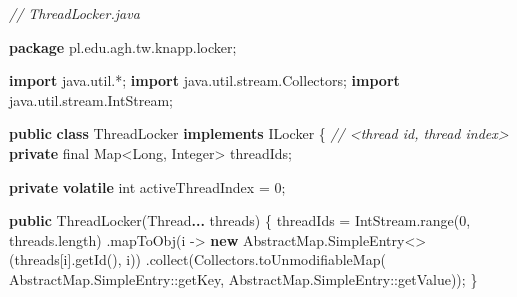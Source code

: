 \documentclass[11pt]{article}
\newenvironment{Shaded}{}{}
\newcommand{\KeywordTok}[1]{\textcolor[rgb]{0.00,0.44,0.13}{\textbf{{#1}}}}
\newcommand{\DataTypeTok}[1]{\textcolor[rgb]{0.56,0.13,0.00}{{#1}}}
\newcommand{\DecValTok}[1]{\textcolor[rgb]{0.25,0.63,0.44}{{#1}}}
\newcommand{\CommentTok}[1]{\textcolor[rgb]{0.38,0.63,0.69}{\textit{{#1}}}}
\newcommand{\FunctionTok}[1]{\textcolor[rgb]{0.02,0.16,0.49}{{#1}}}
\newcommand{\NormalTok}[1]{{#1}}
\newcommand{\ImportTok}[1]{{#1}}
\newcommand{\OperatorTok}[1]{\textcolor[rgb]{0.40,0.40,0.40}{{#1}}}
\newcommand{\BuiltInTok}[1]{{#1}}
\begin{document}
\begin{Shaded}
\begin{Highlighting}[]
\CommentTok{// ThreadLocker.java}

\KeywordTok{package}\ImportTok{ pl}\OperatorTok{.}\ImportTok{edu}\OperatorTok{.}\ImportTok{agh}\OperatorTok{.}\ImportTok{tw}\OperatorTok{.}\ImportTok{knapp}\OperatorTok{.}\ImportTok{locker}\OperatorTok{;}

\KeywordTok{import} \ImportTok{java}\OperatorTok{.}\ImportTok{util}\OperatorTok{.*;}
\KeywordTok{import} \ImportTok{java}\OperatorTok{.}\ImportTok{util}\OperatorTok{.}\ImportTok{stream}\OperatorTok{.}\ImportTok{Collectors}\OperatorTok{;}
\KeywordTok{import} \ImportTok{java}\OperatorTok{.}\ImportTok{util}\OperatorTok{.}\ImportTok{stream}\OperatorTok{.}\ImportTok{IntStream}\OperatorTok{;}

\KeywordTok{public} \KeywordTok{class}\NormalTok{ ThreadLocker }\KeywordTok{implements}\NormalTok{ ILocker }\OperatorTok{\{}
    \CommentTok{// \textless{}thread id, thread index\textgreater{}}
    \KeywordTok{private} \DataTypeTok{final} \BuiltInTok{Map}\OperatorTok{\textless{}}\BuiltInTok{Long}\OperatorTok{,} \BuiltInTok{Integer}\OperatorTok{\textgreater{}}\NormalTok{ threadIds}\OperatorTok{;}

    \KeywordTok{private} \KeywordTok{volatile} \DataTypeTok{int}\NormalTok{ activeThreadIndex }\OperatorTok{=} \DecValTok{0}\OperatorTok{;}

    \KeywordTok{public} \FunctionTok{ThreadLocker}\OperatorTok{(}\BuiltInTok{Thread}\KeywordTok{...}\NormalTok{ threads}\OperatorTok{)} \OperatorTok{\{}
\NormalTok{        threadIds }\OperatorTok{=}\NormalTok{ IntStream}\OperatorTok{.}\FunctionTok{range}\OperatorTok{(}\DecValTok{0}\OperatorTok{,}\NormalTok{ threads}\OperatorTok{.}\FunctionTok{length}\OperatorTok{)}
                \OperatorTok{.}\FunctionTok{mapToObj}\OperatorTok{(}\NormalTok{i }\OperatorTok{{-}\textgreater{}} \KeywordTok{new} \BuiltInTok{AbstractMap}\OperatorTok{.}\FunctionTok{SimpleEntry}\OperatorTok{\textless{}\textgreater{}(}\NormalTok{threads}\OperatorTok{[}\NormalTok{i}\OperatorTok{].}\FunctionTok{getId}\OperatorTok{(),}\NormalTok{ i}\OperatorTok{))}
                \OperatorTok{.}\FunctionTok{collect}\OperatorTok{(}\NormalTok{Collectors}\OperatorTok{.}\FunctionTok{toUnmodifiableMap}\OperatorTok{(}
                    \BuiltInTok{AbstractMap}\OperatorTok{.}\FunctionTok{SimpleEntry}\OperatorTok{::}\NormalTok{getKey}\OperatorTok{,} \BuiltInTok{AbstractMap}\OperatorTok{.}\FunctionTok{SimpleEntry}\OperatorTok{::}\NormalTok{getValue}\OperatorTok{));}
    \OperatorTok{\}}


\end{Highlighting}
\end{Shaded}
\end{document}
